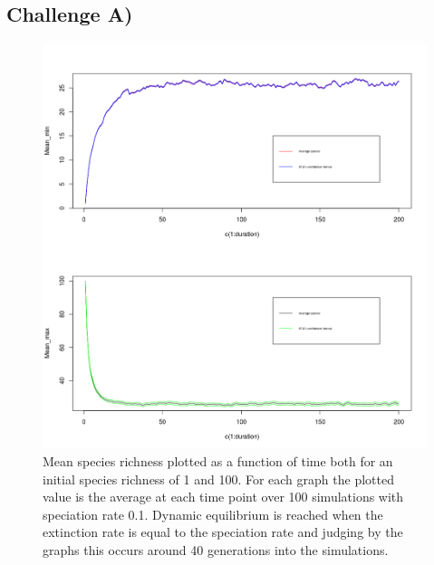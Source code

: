 \documentclass[11pt]{article}
\begin{document}
\subsection*{Challenge A)}
\begin{figure}[H]
\begin{center}
\includegraphics[scale=0.48]{../Results/Plots/challenge_A.png}
\end{center}
\caption{Mean species richness plotted as a function of time both for an initial species richness of 1 and 100. For each graph the plotted value is the average at each time point over 100 simulations with speciation rate 0.1. Dynamic equilibrium is reached when the extinction rate is equal to the speciation rate and judging by the graphs this occurs around 40 generations into the simulations.}
\end{figure}
\end{document}
